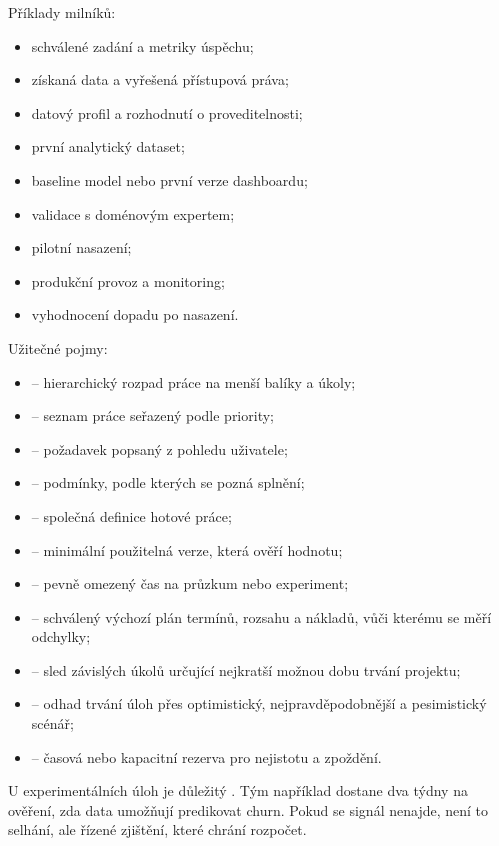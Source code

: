 Příklady milníků:
\begin{itemize}
  \item schválené zadání a metriky úspěchu;
  \item získaná data a vyřešená přístupová práva;
  \item datový profil a rozhodnutí o proveditelnosti;
  \item první analytický dataset;
  \item baseline model nebo první verze dashboardu;
  \item validace s doménovým expertem;
  \item pilotní nasazení;
  \item produkční provoz a monitoring;
  \item vyhodnocení dopadu po nasazení.
\end{itemize}

Užitečné pojmy:
\begin{itemize}
  \item {} -- hierarchický rozpad práce na menší balíky a úkoly;
  \item {} -- seznam práce seřazený podle priority;
  \item {} -- požadavek popsaný z pohledu uživatele;
  \item {} -- podmínky, podle kterých se pozná splnění;
  \item {} -- společná definice hotové práce;
  \item {} -- minimální použitelná verze, která ověří hodnotu;
  \item {} -- pevně omezený čas na průzkum nebo experiment;
  \item {} -- schválený výchozí plán termínů, rozsahu a nákladů, vůči kterému se
  měří odchylky;
  \item {} -- sled závislých úkolů určující nejkratší možnou dobu trvání projektu;
  \item {} -- odhad trvání úloh přes optimistický, nejpravděpodobnější a pesimistický scénář;
  \item {} -- časová nebo kapacitní rezerva pro nejistotu a zpoždění.
\end{itemize}

U experimentálních úloh je důležitý . Tým například dostane dva týdny na ověření, zda data umožňují predikovat churn. Pokud se signál nenajde, není to selhání, ale řízené zjištění, které chrání rozpočet.

